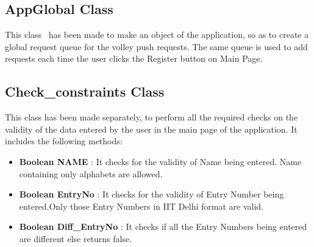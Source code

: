 \documentclass{article}
\begin{document}
\subsection{AppGlobal Class}
\par\noindent This class~\cite{android_app_object} has been made to make an object of the application, so as to create a global request queue for the volley push requests. The same queue is used to add requests each time the user clicks the Register button on Main Page.

\subsection{Check\_constraints Class}
\par\noindent This class has been made separately, to perform all the required checks on the validity of the data entered by the user in the main page of the application. It includes the following methods:
\begin{itemize}
\item\textbf{Boolean NAME} : It checks for the validity of Name being entered. Name containing only alphabets are allowed.
\item\textbf{Boolean EntryNo} : It checks for the validity of Entry Number being entered.Only those Entry Numbers in IIT Delhi format are valid.
\item\textbf{Boolean Diff\_EntryNo} : It checks if all the Entry Numbers being entered are different else returns false.
\end{itemize}
\end{document}
